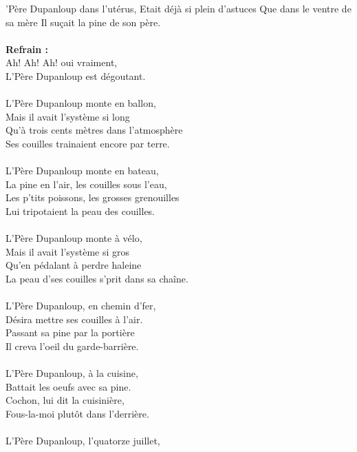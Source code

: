 
 'Père Dupanloup dans l'utérus, \bissimple
Etait déjà si plein d'astuces \bissimple
Que dans le ventre de sa mère
Il suçait la pine de son père.
\\\\\textbf{Refrain :}
\\Ah! Ah! Ah! oui vraiment,
\\L'Père Dupanloup est dégoutant.
\\\\L'Père Dupanloup monte en ballon, \bissimple
\\Mais il avait l'système si long \bissimple
\\Qu'à trois cents mètres dans l'atmosphère
\\Ses couilles trainaient encore par terre.
\\\\L'Père Dupanloup monte en bateau, \bissimple
\\La pine en l'air, les couilles sous l'eau, \bissimple
\\Les p'tits poissons, les grosses grenouilles
\\Lui tripotaient la peau des couilles.
\\\\L'Père Dupanloup monte à vélo, \bissimple
\\Mais il avait l'système si gros \bissimple
\\Qu'en pédalant à perdre haleine
\\La peau d'ses couilles s'prit dans sa chaîne.
\\\\L'Père Dupanloup, en chemin d'fer, \bissimple
\\Désira mettre ses couilles à l'air. \bissimple
\\Passant sa pine par la portière
\\Il creva l'oeil du garde-barrière.
\\\\L'Père Dupanloup, à la cuisine, \bissimple
\\Battait les oeufs avec sa pine. \bissimple
\\Cochon, lui dit la cuisinière,
\\Fous-la-moi plutôt dans l'derrière.
\\\\L'Père Dupanloup, l'quatorze juillet, \bissimple
